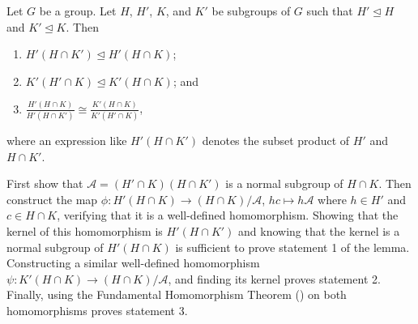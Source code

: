 \begin{lemma}[Zassenhaus]\label{lemma-zassenhaus}
    Let $G$ be a group. Let $H$, $H'$, $K$, and $K'$ be subgroups of $G$ such that $H' \unlhd H$ and $K' \unlhd K$. Then
    \begin{enumerate}
        \item $H'(H \cap K') \unlhd H' (H \cap K)$;
        \item $K'(H' \cap K) \unlhd K' (H \cap K)$; and
        \item $\frac{H'(H\cap K)}{H'(H\cap K')} \cong \frac{K'(H\cap K)}{K'(H'\cap K)}$,
    \end{enumerate}
    where an expression like $H'(H \cap K')$ denotes the subset product of $H'$ and $H \cap K'$.
\end{lemma}
\begin{proofsketch}
    First show that $\mathcal{A} = (H' \cap K)(H \cap K')$ is a normal subgroup of $H \cap K$. Then construct the map $\phi: H'(H\cap K) \to (H\cap K)/\mathcal{A}$, $hc \mapsto h\mathcal{A}$ where $h \in H'$ and $c \in H \cap K$, verifying that it is a well-defined homomorphism. Showing that the kernel of this homomorphism is $H'(H \cap K')$ and knowing that the kernel is a normal subgroup of $H'(H\cap K)$ is sufficient to prove statement 1 of the lemma. Constructing a similar well-defined homomorphism $\psi: K'(H\cap K) \to (H\cap K)/\mathcal{A}$, and finding its kernel proves statement 2. Finally, using the Fundamental Homomorphism Theorem () on both homomorphisms proves statement 3.
\end{proofsketch}
